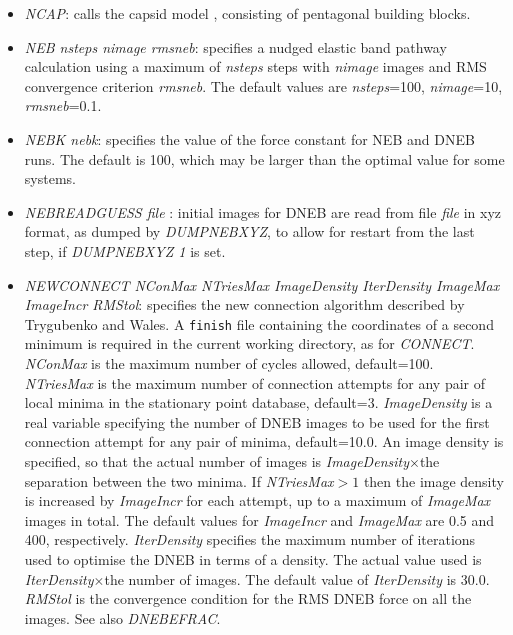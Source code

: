 \documentclass[12pt,a4paper,dvips]{article}
\begin{document}
\begin{itemize}
\item {\it NCAP\/}: calls the capsid model \cite{Wales05}, consisting of pentagonal building blocks.

\item {\it NEB nsteps nimage rmsneb\/}: specifies a nudged elastic band pathway 
calculation\cite{HenkelmanJ00,HenkelmanUJ00} using a maximum of {\it nsteps\/} steps with
{\it nimage\/} images and RMS convergence criterion {\it rmsneb\/}. The default values are
{\it nsteps\/}=100, {\it nimage\/}=10, {\it rmsneb\/}=0.1.

\item {\it NEBK nebk\/}: specifies the value of the force constant for NEB and 
DNEB runs. The default is 100, which may be larger than the optimal
value for some systems.

\item {\it NEBREADGUESS file \/}: initial images for DNEB are read from file {\it file} 
in xyz format, as dumped by {\it DUMPNEBXYZ\/}, to allow for restart from the last 
step, if {\it DUMPNEBXYZ 1\/} is set. 

\item {\it NEWCONNECT NConMax NTriesMax ImageDensity IterDensity ImageMax ImageIncr RMStol\/}: 
specifies the new connection algorithm described by Trygubenko and Wales.\cite{TrygubenkoW04}
A {\tt finish} file containing the coordinates of a second minimum is required in the
current working directory, as for {\it CONNECT\/}.
{\it NConMax\/} is the maximum number of cycles allowed, default=100. 
{\it NTriesMax\/} is the maximum number of connection attempts for any pair of
local minima in the stationary point database, default=3. 
{\it ImageDensity\/} is a real variable specifying the number of DNEB images to be used for
the first connection attempt for any pair of minima, default=10.0. 
An image density is specified, so that the actual number of images is {\it ImageDensity\/}$\times$the
separation between the two minima.
If {\it NTriesMax}$>1$ then 
the image density is increased by {\it ImageIncr\/} for each attempt, up to
a maximum of {\it ImageMax\/} images in total. 
The default values for {\it ImageIncr\/} and {\it ImageMax\/} are 0.5 and 400, respectively.
{\it IterDensity\/} specifies the maximum number of iterations used to optimise the
DNEB in terms of a density. The actual value used is {\it IterDensity\/}$\times$the
number of images.
The default value of {\it IterDensity\/} is 30.0.
{\it RMStol\/} is the convergence condition for the RMS DNEB force on all the images. 
See also {\it DNEBEFRAC\/}.


\end{itemize}
\end{document}
